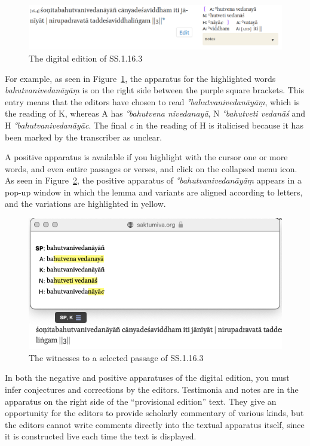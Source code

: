 \begin{figure}[h]
    \centering
    \includegraphics[draft=false, width=\textwidth]{media/SS.1.16-2}
    \caption{The digital edition of SS.1.16.3}
    \label{SS.1.16}
\end{figure}

For example, as seen in Figure~\ref{SS.1.16}, the apparatus for the highlighted words 
\emph{bahutvanivedanāyāṃ} is on the right side between the purple square 
brackets. This entry means that the editors have chosen to read 
\emph{°bahutvanivedanāyāṃ}, which is the reading of K, whereas A has 
\emph{°bahutvena nivedanayā}, N \emph{°bahutveti vedanāś} and H 
\emph{°bahutvanivedanāyāc}. The final \emph{c} in the reading of H is italicised 
because it has been marked by the transcriber as unclear.

A positive apparatus is available if you highlight with the cursor one or more
words, and even entire passages or verses, and click on the collapsed menu icon.
As seen in Figure~\ref{SS.1.16.3}, the positive apparatus of
\emph{°bahutvanivedanāyāṃ} appears in a pop-up window in which the lemma and
variants are aligned according to letters, and the variations are highlighted in
yellow.

\begin{figure}[h]
    \centering
    \includegraphics[draft=false,width=\textwidth]{media/SS.1.16.positive}
    \caption{The witnesses to a selected passage of SS.1.16.3}
    \label{SS.1.16.3}
\end{figure}

In both the negative and positive apparatuses of the digital edition, you must
infer conjectures and corrections by the editors. Testimonia and notes are in the
apparatus on the right side of the “provisional edition” text.  They give an
opportunity for the editors to provide scholarly commentary of various kinds, but
the editors cannot write comments directly into the textual apparatus itself,
since it is constructed live each time the text is displayed.





